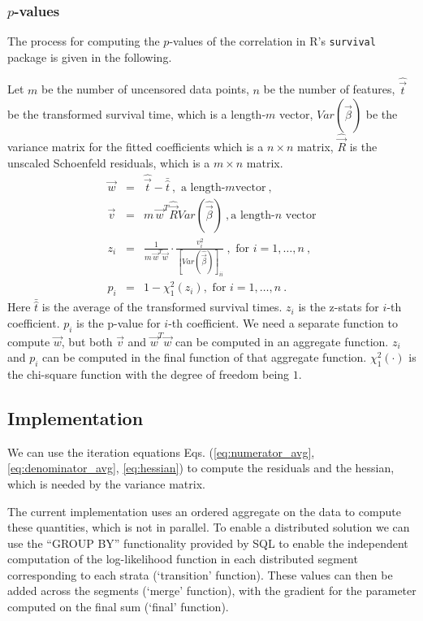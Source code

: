\subsubsection{$p$-values}
The process for computing the $p$-values of the correlation in R's
\texttt{survival} package is given
in the following.

Let $m$ be the number of uncensored data points, $n$ be the number of
features, $\hat{\vec{t}}$ be the transformed survival time, which is a
length-$m$ vector,
$\mathit{Var}(\hat{\vec{\beta}})$ be the variance matrix for the
fitted coefficients which is a $n\times n$ matrix, $\hat{\vec{R}}$
is the unscaled Schoenfeld residuals, which is a $m\times n$ matrix.
\begin{eqnarray}
\vec{w} &=& \hat{\vec{t}} - \bar{\hat{t}}\ , \mbox{ a length-}m \mbox{
  vector}\ ,\\
\vec{v} &=& m\,\vec{w}^T\hat{\vec{R}}\mathit{Var}(\hat{\vec{\beta}})\ , \mbox{
a length-}n\mbox{ vector}\\
z_i &=& \frac{1}{m\,\vec{w}^T\vec{w}}
\cdot\frac{v^2_i}{\left[\mathit{Var}(\hat{\vec{\beta}})\right]_{ii}}\
, \mbox{ for }i=1,\dots,n\ ,\\
p_i &=& 1 - \chi_1^2(z_i), \mbox{ for }i=1,\dots,n\ .
\end{eqnarray}
Here $\bar{\hat{t}}$ is the average of the transformed survival
times. $z_i$ is the z-stats for $i$-th coefficient. $p_i$ is the
p-value for $i$-th coefficient. We need a separate function to compute
$\vec{w}$, but both $\vec{v}$ and $\vec{w}^T\vec{w}$ can be computed
in an aggregate function. $z_i$ and $p_i$ can be computed in the final
function of that aggregate function. $\chi^2_1(\cdot)$ is the
chi-square function with the degree of freedom being $1$.

\subsection{Implementation}
We can use the iteration equations Eqs. (\ref{eq:numerator_avg},
 \ref{eq:denominator_avg}, \ref{eq:hessian}) to compute the residuals and the
hessian, which is needed by the variance matrix.

The current implementation uses an ordered aggregate on the data to
compute these quantities, which is not in parallel. To enable a distributed
solution we can use the ``GROUP BY'' functionality provided by SQL to enable the
independent computation of the log-likelihood function in each distributed segment
corresponding to each strata (`transition' function). These values can then be added
across the segments (`merge' function), with the gradient for the parameter computed
on the final sum (`final' function).

